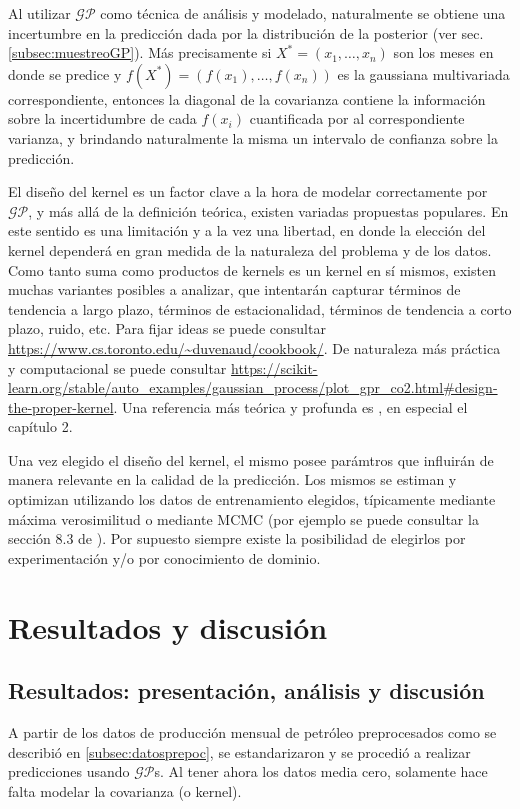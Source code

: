 \documentclass[a4paper]{article}
\newcommand{\gp}{\ensuremath{\mathcal{GP}}}
\begin{document}
Al utilizar $\gp$ como técnica de análisis y modelado, naturalmente se obtiene una incertumbre en la predicción dada por la distribución de la posterior (ver sec. \ref{subsec:muestreoGP}). Más precisamente si $X^{*} = (x_1,\dots,x_n)$ son los meses en donde se predice y $f(X^{*})=(f(x_1),\dots,f(x_n))$ es la gaussiana multivariada correspondiente, entonces la diagonal de la covarianza contiene la información sobre la incertidumbre de cada $f(x_i)$ cuantificada por al correspondiente varianza, y brindando naturalmente la misma un intervalo de confianza sobre la predicción.

El diseño del kernel es un factor clave a la hora de modelar correctamente por $\gp$, y más allá de la definición teórica, existen variadas propuestas populares. En este sentido es una limitación y a la vez una libertad, en donde la elección del kernel dependerá en gran medida de la naturaleza del problema y de los datos. Como tanto suma como productos de kernels es un kernel en sí mismos, existen muchas variantes posibles a analizar, que intentarán capturar términos de tendencia a largo plazo, términos de estacionalidad, términos de tendencia a corto plazo, ruido, etc. Para fijar ideas se puede consultar \url{https://www.cs.toronto.edu/~duvenaud/cookbook/}. De naturaleza más práctica y computacional se puede consultar \url{https://scikit-learn.org/stable/auto_examples/gaussian_process/plot_gpr_co2.html#design-the-proper-kernel}. Una referencia más teórica y profunda es \cite{tesisduvenaud}, en especial el capítulo 2.

Una vez elegido el diseño del kernel, el mismo posee parámtros que influirán de manera relevante en la calidad de la predicción. Los mismos se estiman y optimizan utilizando los datos de entrenamiento elegidos, típicamente mediante máxima verosimilitud o mediante MCMC (por ejemplo se puede consultar la sección 8.3 de \cite{tobar}). Por supuesto siempre existe la posibilidad de elegirlos por experimentación y/o por conocimiento de dominio.




\section{Resultados y discusión}

\subsection{Resultados: presentación, análisis y discusión}
\label{subsec:resultados}
A partir de los datos de producción mensual de petróleo preprocesados como se describió en \ref{subsec:datosprepoc}, se estandarizaron y se procedió a realizar predicciones usando $\gp$s. Al tener ahora los datos media cero, solamente hace falta modelar la covarianza (o kernel).
\end{document}
